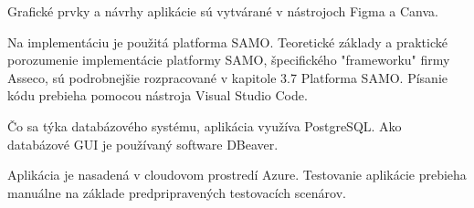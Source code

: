 Grafické prvky a návrhy aplikácie sú vytvárané v nástrojoch Figma a Canva.

Na implementáciu je použitá platforma SAMO. Teoretické základy a praktické porozumenie implementácie platformy SAMO, špecifického "frameworku" firmy Asseco, sú podrobnejšie rozpracované v kapitole 3.7 Platforma SAMO. Písanie kódu prebieha pomocou nástroja Visual Studio Code.

Čo sa týka databázového systému, aplikácia využíva PostgreSQL. Ako databázové GUI je používaný software DBeaver.

Aplikácia je nasadená v cloudovom prostredí Azure. Testovanie aplikácie prebieha manuálne na základe predpripravených testovacích scenárov.


%




%
%
%
%
%
%



